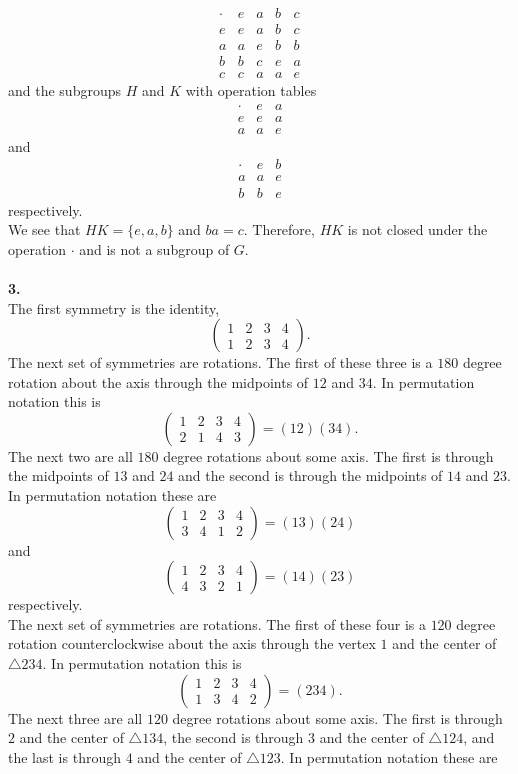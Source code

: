 \documentclass[11pt,a4paper]{article}
\begin{document}
\[
\begin{array}{c|c|c|c|c}
\cdot & e & a & b & c \\ \hline
e & e & a & b & c \\ \hline
a & a & e & b & b \\ \hline
b & b & c & e & a \\ \hline
c & c & a & a & e
\end{array} 
\]
and the subgroups $H$ and $K$ with operation tables 
\[
\begin{array}{c|c|c}
\cdot & e & a \\ \hline
e & e & a \\ \hline
a & a & e
\end{array} 
\]
and
\[
\begin{array}{c|c|c}
\cdot & e & b \\ \hline
a & a & e \\ \hline
b & b & e
\end{array} 
\]
respectively.\\
We see that $HK = \{e,a,b\}$ and $ba = c$. Therefore, $HK$ is not closed under the operation $\cdot$ and is not a subgroup of $G$.\\
~\\
{\bf 3.}\\
The first symmetry is the identity, \[\begin{pmatrix}1&2&3&4\\1&2&3&4\end{pmatrix}.\]
The next set of symmetries are rotations. The first of these three is a $180$ degree rotation about the axis through the midpoints of $12$ and $34$. In permutation notation this is \[\begin{pmatrix}1&2&3&4\\2&1&4&3\end{pmatrix} = (12)(34).\] The next two are all $180$ degree rotations about some axis. The first is through the midpoints of $13$ and $24$ and the second is through the midpoints of $14$ and $23$. In permutation notation these are 
\[\begin{pmatrix}1&2&3&4\\3&4&1&2\end{pmatrix} = (13)(24)\] 
and
\[\begin{pmatrix}1&2&3&4\\4&3&2&1\end{pmatrix} = (14)(23)\] 
respectively.\\
The next set of symmetries are rotations. The first of these four is a $120$ degree rotation counterclockwise about the axis through the vertex $1$ and the center of $\triangle 234$. In permutation notation this is \[\begin{pmatrix}1&2&3&4\\1&3&4&2\end{pmatrix} = (234).\] The next three are all $120$ degree rotations about some axis. The first is through $2$ and the center of $\triangle 134$, the second is through $3$ and the center of $\triangle 124$, and the last is through $4$ and the center of $\triangle 123$. In permutation notation these are
\end{document}
